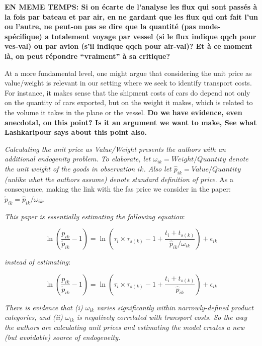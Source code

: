 \documentclass[a4paper,12pt]{article}
\begin{document}
\textbf{EN MEME TEMPS: Si on écarte de l'analyse les flux qui sont passés à la fois par bateau et par air, en ne gardant que les flux qui ont fait l'un ou l'autre, ne peut-on pas se dire que la quantité (pas mode-spécifique) a totalement voyage par vessel (si le flux indique qqch pour ves-val) ou par avion (s'il indique qqch pour air-val)? Et à ce moment là, on peut répondre ``vraiment'' à sa critique?}

At a more fundamental level, one might argue that considering the unit price as value/weight is relevant in our setting where we seek to identify transport costs. For instance, it makes sense that the shipment costs of cars do depend not only on the quantity of cars exported, but on the weight it makes, which is related to the volume it takes in the plane or the vessel. \textbf{Do we have evidence, even anecdotal, on this point? Is it an argument we want to make, See what Lashkaripour says about this point also.}

\textit{Calculating the unit price as Value/Weight presents the authors
with an additional endogenity problem. To elaborate, let $\omega_{ik} = Weight/Quantity$
denote the unit weight of the goods in observation $ik$. Also let $\widehat{p}_{ik} = Value/Quantity$
(unlike what the authors assume) denote standard definition of price}. As a consequence, making the link with the fas price we consider in the paper: $\widetilde{p}_{ik} = \widehat{p}_{ik} / \omega_{ik}$.

\textit{This paper is essentially estimating the following equation}:

\begin{equation*}
\ln\left(\frac{p_{ik}}{\widetilde{p}_{ik}}-1 \right)= \ln \left(\tau_{i} \times \tau_{s(k)} -1 +\frac{t_{i} + t_{s(k)}}{\widehat{p}_{ik}/\omega_{ik}} \right) + \epsilon_{ik}
\end{equation*}

\textit{instead of estimating}:


\begin{equation*}
\ln\left(\frac{p_{ik}}{\widetilde{p}_{ik}}-1 \right)= \ln \left(\tau_{i} \times \tau_{s(k)}-1 +\frac{t_{i} + t_{s(k)}}{\widehat{p}_{ik}} \right) + \epsilon_{ik}
\end{equation*}

\textit{There is evidence that (i) $\omega_{ik}$ varies significantly within narrowly-defined product
categories, and (ii) $\omega_{ik}$ is negatively correlated with transport costs. So the
way the authors are calculating unit prices and estimating the model creates a
new (but avoidable) source of endogeneity.}
\end{document}
